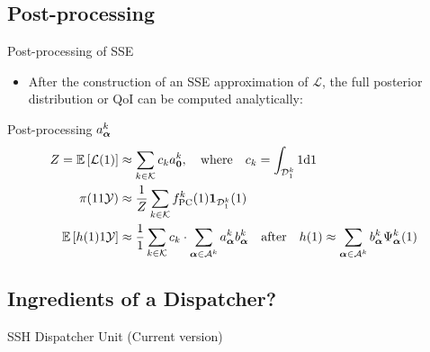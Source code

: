 \documentclass{rsuqbeamernew}
\newcommand{\BParams}{1}
\newcommand{\Bparams}{1}
\newcommand{\Bprior}{1}
\newcommand{\Bcond}{1}
\newcommand{\Bevi}{1}
\begin{document}
\subsection{Post-processing}
\begin{frame}[t]{Post-processing of SSE}
	\small
	\begin{itemize}
		\item[]After the construction of an SSE approximation of 
		$\mathcal{L}$, the full posterior distribution or QoI can be 
		computed analytically:
	\end{itemize}
	
	\begin{block}{Post-processing $a_{\boldsymbol{\alpha}}^k$}
		\begin{align*}
		Z = \Esp{\mathcal{L}(\BParams)}&\approx \sum_{k\in\mathcal{K}} 
		c_k a_{\ve{0}}^k, \quad 
		\text{where} 
		\quad 
		c_k = 
		\int_{\cd_{\BParams}^k}\Bprior\di{\Bparams} \\ 
		\pi(\Bparams\Bcond\cy) &\approx 
		\frac{\Bprior}{Z}\sum_{k\in\mathcal{K}}
		f_{\mathrm{PC}}^k(\Bparams)\ve{1}_{\cd_{\BParams}^k}(\Bparams)\\
		\Esp{h(\BParams)\Bcond\cy} &\approx 
		\frac{1}{\Bevi}\sum_{k\in\mathcal{K}}  c_k\cdot
		\sum_{\ve{\alpha}\in\ca^{k}}a_{\ve{\alpha}}^{k}
		b_{\ve{\alpha}}^{k}
		\quad \text{after} \quad h(\Bparams)\approx 
		\sum_{\ve{\alpha}\in\ca^k}
		b_{\ve{\alpha}}^k\Psi_{\ve{\alpha}}^k(\Bparams)
		\end{align*}
	\end{block}
\end{frame}

\subsection{Ingredients of a Dispatcher?}
\begin{frame}[t]{SSH Dispatcher Unit (Current version)}
  \small
\end{frame}


\end{document}
